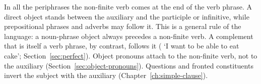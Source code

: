 In all the periphrases the non-finite verb comes at the end of the verb phrase. A direct object stands between the auxiliary and the participle or infinitive, while prepositional phrases and adverbs may follow it. This is a general rule of the language: a noun-phrase object always precedes a non-finite verb. A complement that is itself a verb phrase, by contrast, follows it ( `I want to be able to eat cake'; Section~\ref{sec:perfect}). Object pronouns attach to the non-finite verb, not to the auxiliary (Section~\ref{sec:object-pronouns}). Questions and fronted constituents invert the subject with the auxiliary (Chapter~\ref{ch:simple-clause}).

